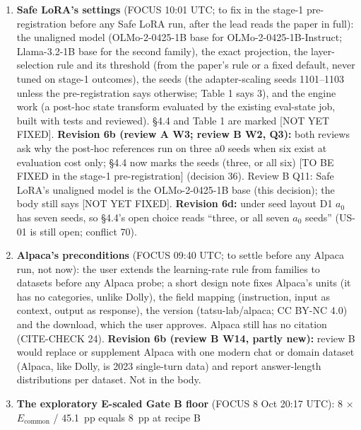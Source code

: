 \documentclass{article}
\theoremstyle{plain}
\theoremstyle{definition}
\theoremstyle{remark}
\begin{document}
\begin{enumerate}
        \S{}4.1 reverts to a placeholder for Llama's rung. The rung-2 reading
        under recipe G (+41.2~pp, partial) is not a recipe-B probe and did not
        set Llama's rate.
  \item \textbf{Safe LoRA's settings} (FOCUS 10:01 UTC; to fix in the stage-1
        pre-registration before any Safe LoRA run, after the lead reads the
        paper in full): the unaligned model (OLMo-2-0425-1B base for
        OLMo-2-0425-1B-Instruct; Llama-3.2-1B base for the second family), the
        exact projection, the layer-selection rule and its threshold (from the
        paper's rule or a fixed default, never tuned on stage-1 outcomes), the
        seeds (the adapter-scaling seeds 1101--1103 unless the pre-registration
        says otherwise; Table 1 says 3), and the engine work (a post-hoc state
        transform evaluated by the existing eval-state job, built with tests and
        reviewed). \S{}4.4 and Table 1 are marked [NOT YET FIXED].
        \textbf{Revision 6b (review A W3; review B W2, Q3):} both reviews ask
        why the post-hoc references run on three a0 seeds when six exist at
        evaluation cost only; \S{}4.4 now marks the seeds (three, or all six)
        [TO BE FIXED in the stage-1 pre-registration] (decision 36). Review B
        Q11: Safe LoRA's unaligned model is the OLMo-2-0425-1B base (this
        decision); the body still says [NOT YET FIXED]. \textbf{Revision 6d:}
        under seed layout D1 $a_0$ has seven seeds, so \S{}4.4's open choice
        reads ``three, or all seven $a_0$ seeds'' (US-01 is still open; conflict
        70).
  \item \textbf{Alpaca's preconditions} (FOCUS 09:40 UTC; to settle before any
        Alpaca run, not now): the user extends the learning-rate rule from
        families to datasets before any Alpaca probe; a short design note fixes
        Alpaca's units (it has no categories, unlike Dolly), the field mapping
        (instruction, input as context, output as response), the version
        (tatsu-lab/alpaca; CC BY-NC 4.0) and the download, which the user
        approves. Alpaca still has no citation (CITE-CHECK 24). \textbf{Revision
        6b (review B W14, partly new):} review B would replace or supplement
        Alpaca with one modern chat or domain dataset (Alpaca, like Dolly, is
        2023 single-turn data) and report answer-length distributions per
        dataset. Not in the body.
  \item \textbf{The exploratory E-scaled Gate B floor} (FOCUS 8 Oct 20:17 UTC):
        8 $\times$ $E_{\mathrm{common}}$ / 45.1~pp equals 8~pp at recipe B

\end{enumerate}
\end{document}
